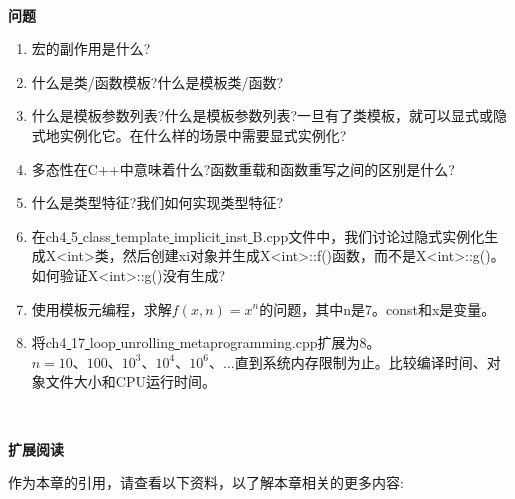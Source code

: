 \noindent\textbf{}\ \par
\textbf{问题} \ \par
\begin{enumerate}
	\item 宏的副作用是什么?
	\item 什么是类/函数模板?什么是模板类/函数?
	\item 什么是模板参数列表?什么是模板参数列表?一旦有了类模板，就可以显式或隐式地实例化它。在什么样的场景中需要显式实例化?
	\item 多态性在C++中意味着什么?函数重载和函数重写之间的区别是什么?
	\item 什么是类型特征?我们如何实现类型特征?
	\item 在ch4\underline{ }5\underline{ }class\underline{ }template\underline{ }implicit\underline{ }inst\underline{ }B.cpp文件中，我们讨论过隐式实例化生成X<int>类，然后创建xi对象并生成X<int>::f()函数，而不是X<int>::g()。如何验证X<int>::g()没有生成?
	\item 使用模板元编程，求解$f(x,n) = x^n$的问题，其中n是7。const和x是变量。
	\item 将ch4\underline{ }17\underline{ }loop\underline{ }unrolling\underline{ }metaprogramming.cpp扩展为8。$n = 10、100、10^3、10^4、10 ^ 6、…$直到系统内存限制为止。比较编译时间、对象文件大小和CPU运行时间。
\end{enumerate}

\noindent\textbf{}\ \par
\textbf{扩展阅读} \ \par
作为本章的引用，请查看以下资料，以了解本章相关的更多内容: \par

